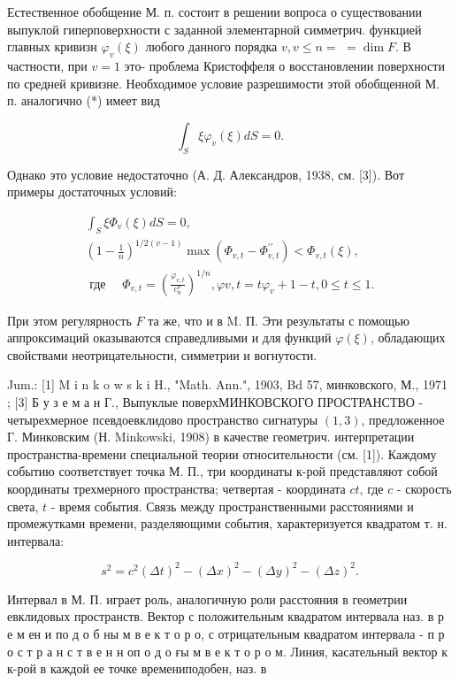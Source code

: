 \documentclass[10pt]{article}
\begin{document}
Естественное обобщение М. п. состоит в решении вопроса о существовании выпуклой гиперповерхности с заданной элементарной симметрич. функцией главных кривизн $\varphi_{v}(\xi)$ любого данного порядка $v, v \leqslant n=$ $=\operatorname{dim} F$. В частности, при $v=1$ это- проблема Кристоффеля о восстановлении поверхности по средней кривизне. Необходимое условие разрешимости этой обобщенной М. п. аналогично (*) имеет вид



\[

\int_{S} \xi \varphi_{v}(\xi) d S=0 .

\]



Однако это условие недостаточно (А. Д. Александров, 1938, см. [3]). Вот примеры достаточных условий:



\[

\begin{gathered}

\int_{S} \xi \Phi_{v}(\xi) d S=0, \\

\left(1-\frac{1}{n}\right)^{1 / 2(v-1)} \max \left(\Phi_{v, t}-\Phi_{v, t}^{\prime \prime}\right)<\Phi_{v, t}(\xi), \\

\text { где } \quad \Phi_{v, t}=\left(\frac{\varphi_{v, t}}{c_{n}^{v}}\right)^{1 / n}, \varphi v, t=t \varphi_{v}+1-t, 0 \leqslant t \leqslant 1 .

\end{gathered}

\]



При этом регулярность $F$ та же, что и в M. П. Эти результаты с помощью аппроксимаций оказываются справедливыми и для функций $\varphi(\xi)$, обладающих свойствами неотрицательности, симметрии и вогнутости.



Jum.: [1] M i n k o w s k i H., "Math. Ann.", 1903, Bd 57, минковского, М., 1971 ; [3] Б у з е м а н Г., Выпуклые поверхМИНКОВСКОГО ПРОСТРАНСТВО - четырехмерное псевдоевклидово пространство сигнатуры $(1,3)$, предложенное Г. Минковским (Н. Minkowski, 1908) в качестве геометрич. интерпретации пространства-времени специальной теории относительности (см. [1]). Каждому событию соответствует точка М. П., три координаты к-рой представляют собой координаты трехмерного пространства; четвертая - координата $c t$, где $c$ - скорость света, $t$ - время события. Связь между пространственными расстояниями и промежутками времени, разделяющими события, характеризуется квадратом т. н. интервала:



\[

s^{2}=c^{2}(\Delta t)^{2}-(\Delta x)^{2}-(\Delta y)^{2}-(\Delta z)^{2} .

\]



Интервал в М. П. играет роль, аналогичную роли расстояния в геометрии евклидовых пространств. Вектор с положительным квадратом интервала наз. в р е м ен и по д о б ны м в е к т о р о, с отрицательным квадратом интервала - п р о с т р а н с т в е н н оп о д о ғы м в е к т о р о м. Линия, касательный вектор к к-рой в каждой ее точке времениподобен, наз. в
\end{document}
